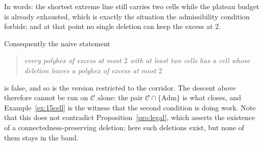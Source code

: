 \documentclass[11pt]{article}
\theoremstyle{plain}
\theoremstyle{definition}
\theoremstyle{remark}
\newcommand{\Adm}{\mathrm{Adm}}
\begin{document}
In words: the shortest extreme line still carries two cells while the plateau budget is
already exhausted, which is exactly the situation the admissibility condition forbids;
and at that point no single deletion can keep the excess at \(2\).

Consequently the naive statement

\begin{quote}
\emph{every polyhex of excess at most \(2\) with at least two cells has a cell whose
deletion leaves a polyhex of excess at most \(2\)}
\end{quote}

is false, and so is the version restricted to the corridor. The descent above
therefore cannot be run on \(\mathcal{C}\) alone: the pair
\(\mathcal{C}\cap\{\Adm\}\) is what closes, and Example~\ref{ex:15cell} is the witness that
the second condition is doing work. Note that this does not contradict
Proposition~\ref{pro:legal}, which asserts the existence of a connectedness-preserving
deletion; here such deletions exist, but none of them stays in the band.



\end{document}
